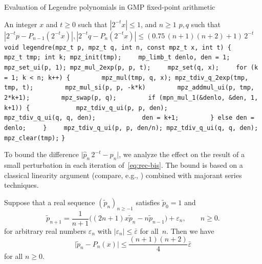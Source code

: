 \documentclass[nohypdvips,review]{siamart0216}
\newcommand{\abs}[1]{\mathopen| #1 \mathclose|}
\begin{document}
\begin{algorithm}[h]
  \caption{Evaluation of Legendre polynomials in GMP fixed-point arithmetic}
  \small
  \label{alg:gmprec}
  \begin{algorithmic}[1]
    \Require An integer $x$ and $t \ge 0$ such that $|2^{-t} x| \le 1$, and $n \ge 1$
    \Ensure $p, q$ such that $|2^{-t} p - P_{n-1}(2^{-t} x)|, |2^{-t} q - P_{n}(2^{-t} x)| \le (0.75 \, (n+1)(n+2) + 1) \, 2^{-t}$
\State \verb!void legendre(mpz_t p, mpz_t q, int n, const mpz_t x, int t) {!
\State \verb!    mpz_t tmp; int k; mpz_init(tmp);!
\State \verb!    mp_limb_t denlo, den = 1;!
\State \verb!    mpz_set_ui(p, 1); mpz_mul_2exp(p, p, t);!
\State \verb!    mpz_set(q, x);!
\State \verb!    for (k = 1; k < n; k++) {!
\State \verb!        mpz_mul(tmp, q, x); mpz_tdiv_q_2exp(tmp, tmp, t);!
\State \verb!        mpz_mul_si(p, p, -k*k)!
\State \verb!        mpz_addmul_ui(p, tmp, 2*k+1);!
\State \verb!        mpz_swap(p, q);!
\State \verb!        if (mpn_mul_1(&denlo, &den, 1, k+1)) {!
\State \verb!            mpz_tdiv_q_ui(p, p, den);!
\State \verb!            mpz_tdiv_q_ui(q, q, den);!
\State \verb!            den = k+1;!
\State \verb!        } else den = denlo;!
\State \verb!    }!
\State \verb!    mpz_tdiv_q_ui(p, p, den/n); mpz_tdiv_q_ui(q, q, den);!
\State \verb!    mpz_clear(tmp);!
\State \verb!}!
  \end{algorithmic}
\end{algorithm}

To bound the difference $\abs{\hat p_n \, 2^{-t} - p_n}$, we analyze
the effect on the result of a small perturbation in each iteration
of \cref{eq:rec-bis}.
The bound is based on a classical linearity argument (compare, e.g.,
\cite{Wimp1984}) combined with majorant series techniques.

\begin{proposition} \label{prop:rec-error}
Suppose that a real sequence $(\tilde p_n)_{n \geq -1}$ satisfies
$\tilde p_0 = 1$ and
\begin{equation} \label{eq:rec-pert}
  \tilde{p}_{n + 1} =
    \frac{1}{n+1}
    \bigl( (2n +1) x \tilde{p}_n - n \tilde{p}_{n-1} \bigr)
    + \varepsilon_n,
  \qquad n \geq 0.
\end{equation}
for arbitrary real numbers $\varepsilon_n$
with $\abs{\varepsilon_n} \leq \bar\varepsilon$ for all $n$.
Then we have
\[
  \abs{\tilde p_n  - P_n(x)}
  \leq \frac{(n+1)(n+2)}{4} \bar \varepsilon
\]
for all $n \geq 0$.
\end{proposition}
\end{document}

